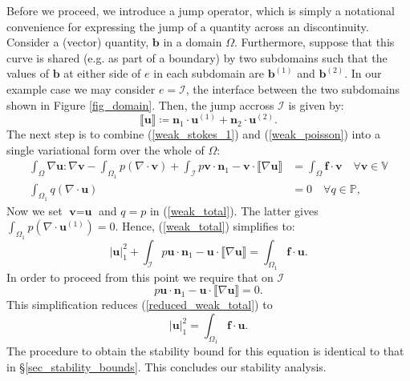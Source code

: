 \documentclass[12pt,a4paper]{article}
\theoremstyle{definition}
\begin{document}
Before we proceed, we introduce a jump operator, which is simply a notational convenience for expressing the jump of a quantity across an discontinuity.  Consider a (vector) quantity, $\textbf{b}$ in a domain $\Omega$.   Furthermore, suppose that this curve is shared (e.g. as part of a boundary) by two subdomains such that the values of $\textbf{b}$ at either side of $e$ in each subdomain are $\textbf{b}^{\left(1\right)}$ and $\textbf{b}^{\left(2\right)}$. In our example case we may consider $e = \mathcal{I}$, the interface between the two subdomains shown in Figure \ref{fig_domain}.  Then, the jump accross $\mathcal{I}$ is given by:
\begin{equation}
\llbracket \textbf{u} \rrbracket \coloneqq \textbf{n}_1\cdot \textbf{u}^{\left(1\right)}+\textbf{n}_2\cdot  \textbf{u}^{\left(2\right)}.
\end{equation}
The next step is to combine (\ref{weak_stokes_1}) and (\ref{weak_poisson}) into a single variational form over the whole of $\Omega$:
\begin{equation}\label{weak_total}
\begin{aligned}
\int_{\Omega}\nabla \textbf{u} : \nabla \textbf{v}-\int_{\Omega_1}p\left(\nabla \cdot \textbf{v}\right) +\int_{\mathcal{I}} p\textbf{v}\cdot \textbf{n}_1-\textbf{v}\cdot\llbracket\nabla\textbf{u}\rrbracket &=\int_{\Omega}\textbf{f}\cdot \textbf{v} \quad \forall  \textbf{v}\in \mathbb{V}\\
\int_{\Omega_1}q\left(\nabla \cdot \textbf{u}\right) &= 0\quad \forall q\in \mathbb{P},
\end{aligned}
\end{equation}
Now we set $\textbf{v}=\textbf{u}$  and $q=p$ in (\ref{weak_total}).  The latter gives $\int_{\Omega_1}p\left(\nabla \cdot \textbf{u}^{\left(1\right)}\right)=0$.  Hence, (\ref{weak_total}) simplifies to:
\begin{equation}\label{reduced_weak_total}
	\left|\textbf{u}\right|_1^2 + \int_{\mathcal{I}}p\textbf{u}\cdot \textbf{n}_1-\textbf{u}\cdot\llbracket \nabla \textbf{u}\rrbracket =\int_{\Omega_1}\textbf{f}\cdot \textbf{u}.
\end{equation}
In order to proceed from this point we require that on $\mathcal{I}$
\begin{equation}
p\textbf{u}\cdot \textbf{n}_1-\textbf{u}\cdot \llbracket \nabla \textbf{u}\rrbracket=0.
\end{equation}
This simplification reduces (\ref{reduced_weak_total}) to 
\begin{equation}
\left|\textbf{u}\right|_1^2 =\int_{\Omega_1}\textbf{f}\cdot \textbf{u}.
\end{equation}
The procedure to obtain the stability bound for this equation is identical to that in \S \ref{sec_stability_bounds}.  This concludes our stability analysis.
\end{document}
